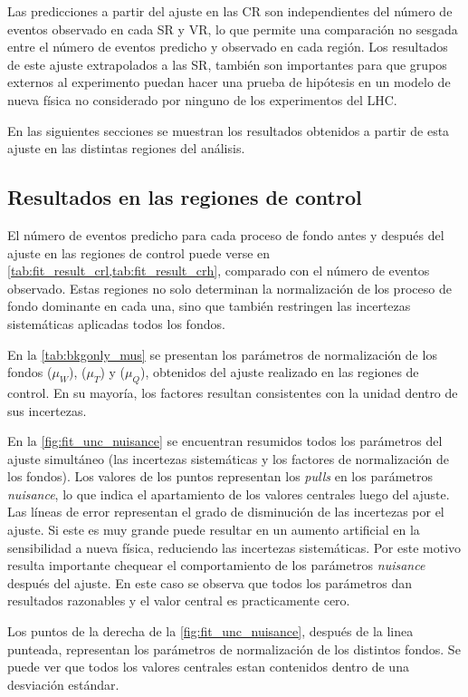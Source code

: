 Las predicciones a partir del ajuste en las CR son independientes del número de
eventos observado en cada SR y VR, lo que permite una comparación no sesgada
entre el número de eventos predicho y observado en cada región. Los resultados
de este ajuste extrapolados a las SR, también son importantes para que grupos
externos al experimento puedan hacer una prueba de hipótesis en un modelo de
nueva física no considerado por ninguno de los experimentos del LHC.

En las siguientes secciones se muestran los resultados obtenidos a partir
de esta ajuste en las distintas regiones del análisis.


\subsection{Resultados en las regiones de control}

El número de eventos predicho para cada proceso de fondo antes y después del ajuste en
las regiones de control puede verse en \cref{tab:fit_result_crl,tab:fit_result_crh},
comparado con el número de eventos observado.
Estas regiones no solo determinan la normalización de los proceso de fondo dominante
en cada una, sino que también restringen las incertezas sistemáticas aplicadas todos
los fondos.

En la \cref{tab:bkgonly_mus} se presentan los parámetros de normalización de
los fondos {\wgam} ($\mu_W$), {\ttgam} ($\mu_T$) y {\gjet}
($\mu_Q$), obtenidos del ajuste realizado en las regiones de control.
En su mayoría, los factores resultan consistentes con la unidad dentro de sus incertezas.

En la \cref{fig:fit_unc_nuisance} se encuentran resumidos todos los parámetros
del ajuste simultáneo (las incertezas sistemáticas y los factores de
normalización de los fondos). Los valores de los puntos representan los
\emph{pulls} en los parámetros \emph{nuisance}, lo que indica el apartamiento de los valores
centrales luego del ajuste. Las líneas de error representan el
 grado de disminución de las incertezas por el
ajuste. Si este es muy grande puede resultar en un aumento artificial
en la sensibilidad a nueva física, reduciendo las incertezas sistemáticas.
Por este motivo resulta importante
chequear el comportamiento de los parámetros \emph{nuisance} después del ajuste.
En este caso se observa que todos los parámetros dan resultados razonables
y el valor central es practicamente cero.

Los puntos de la derecha de la \cref{fig:fit_unc_nuisance}, después de la linea
punteada, representan los parámetros de normalización de los distintos fondos. Se
puede ver que todos los valores centrales estan contenidos dentro de una desviación estándar.

